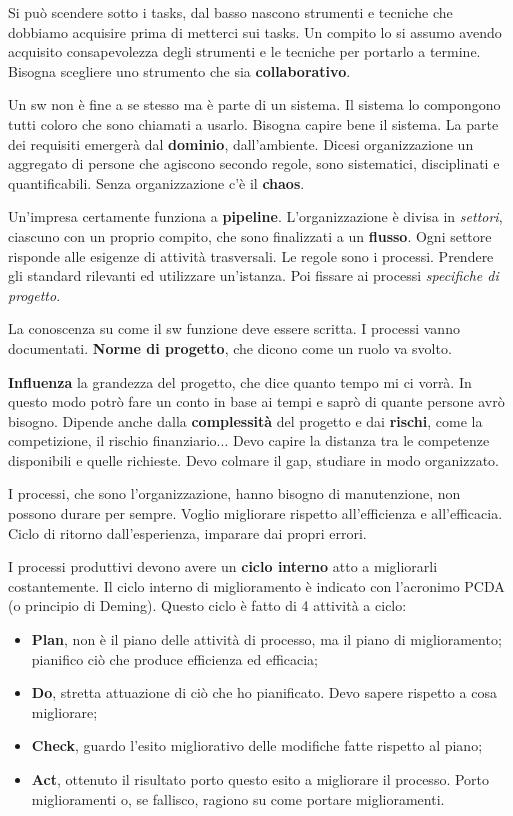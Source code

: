 Si può scendere sotto i tasks, dal basso nascono strumenti e tecniche che dobbiamo acquisire prima di metterci sui tasks. Un compito lo si assumo avendo acquisito consapevolezza degli strumenti e le tecniche per portarlo a termine. Bisogna scegliere uno strumento che sia \textbf{collaborativo}.

Un sw non è fine a se stesso ma è parte di un sistema. Il sistema lo compongono tutti coloro che sono chiamati a usarlo. Bisogna capire bene il sistema. La parte dei requisiti emergerà dal \textbf{dominio}, dall'ambiente. Dicesi organizzazione un aggregato di persone che agiscono secondo regole, sono sistematici, disciplinati e quantificabili. Senza organizzazione c'è il \textbf{chaos}.

Un'impresa certamente funziona a \textbf{pipeline}. L'organizzazione è divisa in \textit{settori}, ciascuno con un proprio compito, che sono finalizzati a un \textbf{flusso}. Ogni settore risponde alle esigenze di attività trasversali. Le regole sono i processi. Prendere gli standard rilevanti ed utilizzare un'istanza. Poi fissare ai processi \textit{specifiche di progetto}. 

La conoscenza su come il sw funzione deve essere scritta. I processi vanno documentati. \textbf{Norme di progetto}, che dicono come un ruolo va svolto.

\textbf{Influenza} la grandezza del progetto, che dice quanto tempo mi ci vorrà. In questo modo potrò fare un conto in base ai tempi e saprò di quante persone avrò bisogno. Dipende anche dalla \textbf{complessità} del progetto e dai \textbf{rischi}, come la competizione, il rischio finanziario... Devo capire la distanza tra le competenze disponibili e quelle richieste. Devo colmare il gap, studiare in modo organizzato.

I processi, che sono l'organizzazione, hanno bisogno di manutenzione, non possono durare per sempre. Voglio migliorare rispetto all'efficienza e all'efficacia. Ciclo di ritorno dall'esperienza, imparare dai propri errori.

I processi produttivi devono avere un \textbf{ciclo interno} atto a migliorarli costantemente. Il ciclo interno di miglioramento è indicato con l'acronimo PCDA (o principio di Deming). Questo ciclo è fatto di 4 attività a ciclo:

\begin{itemize}

	\item \textbf{Plan}, non è il piano delle attività di processo, ma il piano di miglioramento; pianifico ciò che produce efficienza ed efficacia;
	\item \textbf{Do}, stretta attuazione di ciò che ho pianificato. Devo sapere rispetto a cosa migliorare;
	\item \textbf{Check}, guardo l'esito migliorativo delle modifiche fatte rispetto al piano;
	\item \textbf{Act}, ottenuto il risultato porto questo esito a migliorare il processo. Porto miglioramenti o, se fallisco, ragiono su come portare miglioramenti.

\end{itemize}


